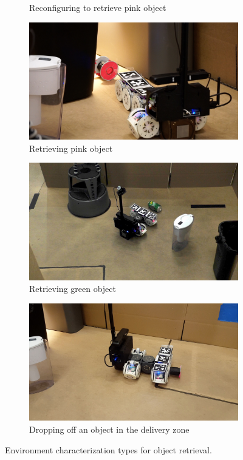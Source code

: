 \documentclass[conference]{IEEEtran}
\begin{document}
\begin{figure}[t]
\begin{subfigure}[t]{0.32\textwidth}
        \caption{Reconfiguring to retrieve pink object}
    \end{subfigure}
    \begin{subfigure}[t]{0.32\textwidth}
        \includegraphics[width=\textwidth]{images/pink_retrieval.jpg}
        \caption{Retrieving pink object}
    \end{subfigure}
    \begin{subfigure}[t]{0.32\textwidth}
        \includegraphics[width=\textwidth]{images/green_retrieval.jpg}
        \caption{Retrieving green object}
    \end{subfigure}
    \begin{subfigure}[t]{0.32\textwidth}
        \includegraphics[width=\textwidth]{images/dropoff.jpg}
        \caption{Dropping off an object in the delivery zone}
    \end{subfigure}
      \caption{Environment characterization types for object retrieval.}
      \label{fig:demo}
   \end{figure}
\end{document}
